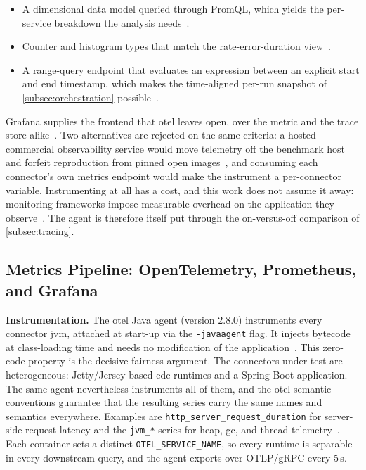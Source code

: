 \begin{itemize}[leftmargin=*, itemsep=2pt, topsep=4pt]
    \item A dimensional data model queried through PromQL, which yields the per-service breakdown the analysis needs~\citep{prometheusOverview}.
    \item Counter and histogram types that match the rate-error-duration view~\citep{prometheusMetricTypes}.
    \item A range-query endpoint that evaluates an expression between an explicit start and end timestamp, which makes the time-aligned per-run snapshot of \cref{subsec:orchestration} possible~\citep{prometheusHttpApi}.
\end{itemize}
 Grafana supplies the frontend that \gls{otel} leaves open, over the metric and the trace store alike~\citep{grafanaDocs, grafanaTempoDocs}. Two alternatives are rejected on the same criteria: a hosted commercial observability service would move telemetry off the benchmark host and forfeit reproduction from pinned open images~\citep{papadopoulos2021reproducible}, and consuming each connector's own metrics endpoint would make the instrument a per-connector variable. Instrumenting at all has a cost, and this work does not assume it away: monitoring frameworks impose measurable overhead on the application they observe~\citep{reichelt2021overhead}. The agent is therefore itself put through the on-versus-off comparison of \cref{subsec:tracing}.

\subsection{Metrics Pipeline: OpenTelemetry, Prometheus, and Grafana}\label{subsec:metrics-pipeline}

\textbf{Instrumentation.} The \gls{otel} Java agent (version 2.8.0) instruments every connector \gls{jvm}, attached at start-up via the \texttt{-javaagent} flag. It injects bytecode at class-loading time and needs no modification of the application~\citep{otelJavaAgent}. This zero-code property is the decisive fairness argument. The connectors under test are heterogeneous: Jetty/Jersey-based \gls{edc} runtimes and a Spring Boot application. The same agent nevertheless instruments all of them, and the \gls{otel} semantic conventions guarantee that the resulting series carry the same names and semantics everywhere. Examples are \texttt{http\_server\_request\_duration} for server-side request latency and the \texttt{jvm\_*} series for heap, \gls{gc}, and thread telemetry~\citep{opentelemetrySemconv}. Each container sets a distinct \texttt{OTEL\_SERVICE\_NAME}, so every runtime is separable in every downstream query, and the agent exports over OTLP/gRPC every 5\,s.

